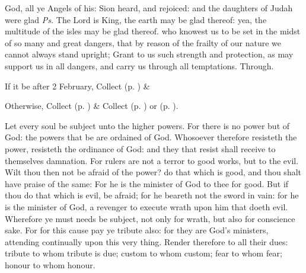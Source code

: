 \introit
{} God, all ye Angels of his: Sion heard, and rejoiced: and the daughters of Judah were glad \textit{Ps.} The Lord is King, the earth may be glad thereof: yea, the multitude of the isles may be glad thereof.
\collect
{} who knowest us to be set in the midst of so many and great dangers, that by reason of the frailty of our nature we cannot always stand upright; Grant to us such strength and protection, as may support us in all dangers, and carry us through all temptations. Through.
\begin{rubric}
    If it be after 2 February,  Collect  (p. \pageref{SPSaints}) \&  
\end{rubric}
\begin{rubric}
	Otherwise,  Collect  (p. \pageref{SPMaryPostChristmas}) \&  Collect  (p. \pageref{SPAgainst}) or  (p. \pageref{SPChiefBishop}).
\end{rubric}
 Let every soul be subject unto the higher powers. For there is no power but of God: the powers that be are ordained of God. Whosoever therefore resisteth the power, resisteth the ordinance of God: and they that resist shall receive to themselves damnation. For rulers are not a terror to good works, but to the evil. Wilt thou then not be afraid of the power? do that which is good, and thou shalt have praise of the same: For he is the minister of God to thee for good. But if thou do that which is evil, be afraid; for he beareth not the sword in vain: for he is the minister of God, a revenger to execute wrath upon him that doeth evil. Wherefore ye must needs be subject, not only for wrath, but also for conscience sake. For for this cause pay ye tribute also: for they are God's ministers, attending continually upon this very thing. Render therefore to all their dues: tribute to whom tribute is due; custom to whom custom; fear to whom fear; honour to whom honour.


